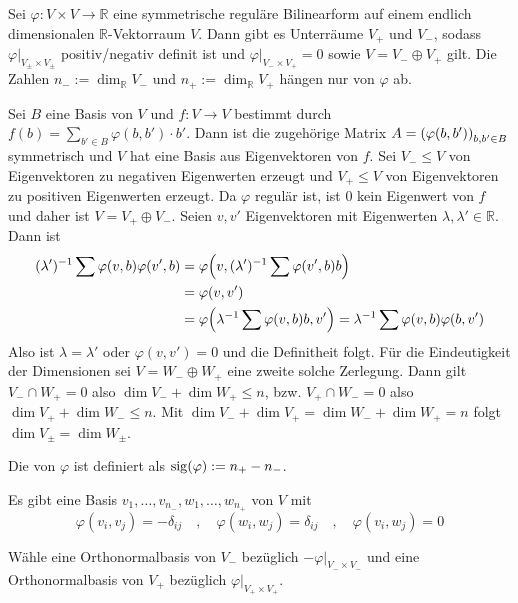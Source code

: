 \begin{lemma}[{name=[{Zerlegung eines Vektorraums mittels Bilinearform}]}]
	Sei $\varphi \colon V \times V \to \mathbb{R}$ eine symmetrische reguläre Bilinearform auf einem endlich dimensionalen $\mathbb{R}$-Vektorraum $V$.
	Dann gibt es Unterräume $V_+$ und $V_-$, sodass $\varphi|_{V_\pm \times V_\pm}$ positiv/negativ definit ist und $\varphi|_{V_- \times V_+}=0$ sowie $V= V_- \oplus V_+$ gilt.
	Die Zahlen $n_- := \dim_\mathbb{R} V_-$ und $n_+ := \dim_\mathbb{R} V_+$ hängen nur von $\varphi$ ab.
\end{lemma}
\begin{beweis}
	Sei $B$ eine Basis von $V$ und $f \colon V \to V$ bestimmt durch $f(b)= \sum_{b' \in B} \varphi(b,b') \cdot b'$.
	Dann ist die zugehörige Matrix $A= \enbrace*{\varphi(b,b')}_{b,b' \in B}$ symmetrisch und $V$ hat eine Basis aus Eigenvektoren von $f$.
	Sei $V_- \le V$ von Eigenvektoren zu negativen Eigenwerten erzeugt und $V_+ \le V$ von Eigenvektoren zu positiven Eigenwerten erzeugt.
	Da $\varphi$ regulär ist, ist $0$ kein Eigenwert von $f$ und daher ist $V= V_+ \oplus V_-$.
	Seien $v,v'$ Eigenvektoren mit Eigenwerten $\lambda,\lambda' \in \mathbb{R}$.
	Dann ist
	\begin{align}
		(\lambda')^{-1} \sum \varphi(v,b) \varphi(v',b)&= \varphi \enbrace*{v, (\lambda')^{-1} \sum \varphi(v',b) b} \\ &= \varphi(v,v')\\
		&= \varphi \enbrace*{\lambda^{-1} \sum \varphi(v,b)b , v'} = \lambda^{-1} \sum \varphi(v,b) \varphi(b,v')
	\end{align}
	Also ist $\lambda=\lambda'$ oder $\varphi(v,v')=0$ und die Definitheit folgt. 
	Für die Eindeutigkeit der Dimensionen sei $V=W_- \oplus W_+$ eine zweite solche Zerlegung. 
	Dann gilt $V_- \cap W_+ =0$ also $\dim V_- + \dim W_+ \le n$, bzw. $V_+ \cap W_- =0$ also $\dim V_+ + \dim W_- \le n$.
	Mit $\dim V_- + \dim V_+ = \dim W_- + \dim W_+ = n$ folgt $\dim V_{\pm} = \dim W_{\pm}$.
\end{beweis}

\begin{definition}[{name=[Signatur]}]
	Die  von $\varphi$ ist definiert als $\sig(\varphi) := n_+ - n_-$. 
\end{definition}

\begin{korollar}[{name=[{Basis mit Kronecker-Delta bezüglich der Bilinearform}]},label=korr:basis_kron_delta]
	Es gibt eine Basis $v_1, \ldots , v_{n_-}, w_1 , \ldots , w_{n_+}$ von $V$ mit 
	\[
		\varphi(v_i,v_j) = - \delta_{ij} \quad , \quad \varphi(w_i,w_j) =\delta_{ij} \quad , \quad \varphi(v_i,w_j)=0
	\]
\end{korollar}
\begin{beweis}
	Wähle eine Orthonormalbasis von $V_-$ bezüglich $-\varphi|_{V_- \times V_-}$ und eine Orthonormalbasis von $V_+$ bezüglich $\varphi|_{V_+ \times V_+}$.
\end{beweis}

